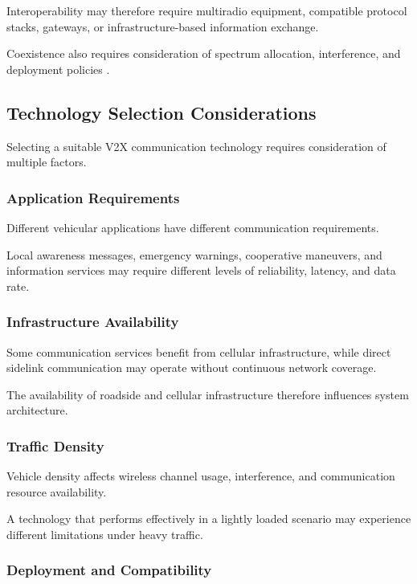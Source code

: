 Interoperability may
therefore require
multiradio equipment,
compatible protocol
stacks, gateways,
or infrastructure-based
information exchange.

Coexistence also
requires consideration
of spectrum allocation,
interference, and
deployment policies
\cite{MacHardy2018}.

\subsection{Technology Selection Considerations}

Selecting a suitable
V2X communication
technology requires
consideration of
multiple factors.

\subsubsection{Application Requirements}

Different vehicular
applications have
different communication
requirements.

Local awareness
messages, emergency
warnings, cooperative
maneuvers, and
information services
may require different
levels of reliability,
latency, and data rate.

\subsubsection{Infrastructure Availability}

Some communication
services benefit from
cellular infrastructure,
while direct sidelink
communication may
operate without
continuous network
coverage.

The availability
of roadside and
cellular infrastructure
therefore influences
system architecture.

\subsubsection{Traffic Density}

Vehicle density affects
wireless channel usage,
interference, and
communication resource
availability.

A technology that
performs effectively
in a lightly loaded
scenario may experience
different limitations
under heavy traffic.

\subsubsection{Deployment and Compatibility}

